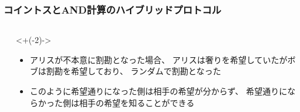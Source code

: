 \begin{frame}
  \frametitle{コイントスとAND計算のハイブリッドプロトコル}

  \begin{columns}
    \begin{column}{0.6\textwidth}

    \end{column}
    \begin{column}{0.4\textwidth}
      \uncover<+(-2)->{
        \begin{itemize}
          \item アリスが不本意に割勘となった場合、
          アリスは奢りを希望していたがボブは割勘を希望しており、
          ランダムで割勘となった

          \item<2-> このように希望通りになった側は相手の希望が分からず、
          希望通りにならかった側は相手の希望を知ることができる
        \end{itemize}
      }
    \end{column}
  \end{columns}
\end{frame}

